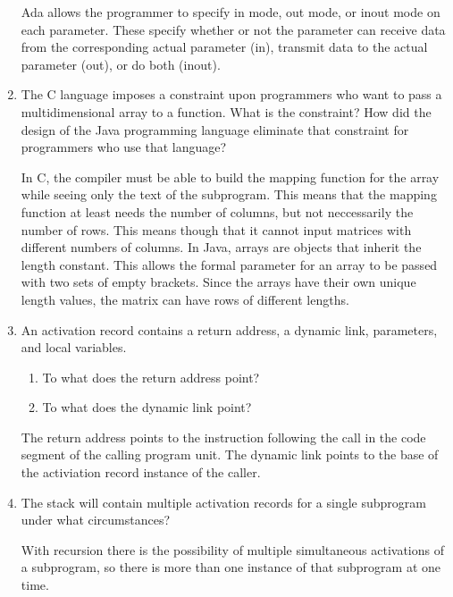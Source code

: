 \begin{enumerate}
  \begin{answer}
    Ada allows the programmer to specify in mode, out mode, or inout mode on each parameter. These specify whether or not the parameter can receive data from the corresponding actual parameter (in), transmit data to the actual parameter (out), or do both (inout).
  \end{answer}
 
  \item The C language imposes a constraint upon programmers
    who want to pass a multidimensional array to a function.
    What is the constraint? How did the design of the Java
    programming language eliminate that constraint for 
    programmers who use that language?

  \begin{answer}
    In C, the compiler must be able to build the mapping function for the array while seeing only the text of the subprogram. This means that the mapping function at least needs the number of columns, but not neccessarily the number of rows. This means though that it cannot input matrices with different numbers of columns.
    In Java, arrays are objects that inherit the length constant. This allows the formal parameter for an array to be passed with two sets of empty brackets. Since the arrays have their own unique length values, the matrix can have rows of different lengths.
  \end{answer}

  \item An activation record contains a return
    address, a dynamic link, parameters, and
    local variables.
  \begin{enumerate}
    \item To what does the return address point?
    \item To what does the dynamic link point?
    \end{enumerate}

  \begin{answer}
    The return address points to the instruction following the call in the code segment of the calling program unit. The dynamic link points to the base of the activiation record instance of the caller.
  \end{answer}

  \item The stack will contain multiple activation
    records for a single subprogram under what
    circumstances?

  \begin{answer}
    With recursion there is the possibility of multiple simultaneous activations of a subprogram, so there is more than one instance of that subprogram at one time.
  \end{answer}


\end{enumerate}

